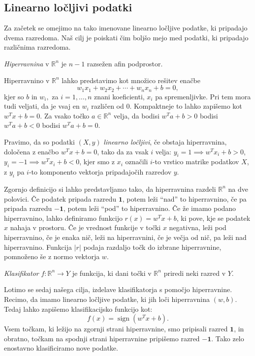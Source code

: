 \documentclass[mat1]{fmfdelo}
\newcommand{\R}{\mathbb R}
\DeclareMathOperator{\sign}{sign}
\newcommand{\pr}{\mathbf 1}
\newcommand{\nr}{\mathbf {-1}}
\begin{document}
\subsection{Linearno ločljivi podatki}

Za začetek se omejimo na tako imenovane linearno ločljive podatke, ki pripadajo dvema razredoma. Naš cilj je poiskati čim boljšo mejo med podatki, ki pripadajo različnima razredoma. 

\begin{definicija}
	\emph{Hiperravnina} v $\R^n$ je $n - 1$ razsežen afin podprostor. 
\end{definicija}
Hiperravnino v  $\R^n$ lahko predstavimo kot množico rešitev enačbe $$ w_1x_1 + w_2x_2 + \cdots + w_nx_n + b = 0,$$ kjer so $b$ in $w_i, $ za $ i = 1,\ldots,n $ znani koeficienti, $x_i$ pa spremenljivke. Pri tem mora tudi veljati, da je vsaj en $w_i$ različen od $0$. Kompaktneje to lahko zapišemo kot $w^Tx  + b = 0$. Za vsako točko $a \in \R^n$ velja, da bodisi $w^Ta  + b > 0$ bodisi $w^Ta+ b < 0$ bodisi $w^Ta+ b = 0$. 

\begin{definicija}
	Pravimo, da so podatki $(X, y)$ \emph{linearno ločljivi}, če obstaja hiperravnina, določena z enačbo $w^Tx+ b = 0$, tako da za vsak $i$ velja:
	$y_i = 1 \implies w^Tx_i+ b > 0$,  $y_i = -1 \implies w^Tx_i+ b < 0$, kjer smo z $x_i$ označili $i$-to vrstico matrike podatkov $X$, z $y_i$ pa $i$-to komponento vektorja pripadajočih razredov $y$.
\end{definicija} 

Zgornjo definicijo si lahko predstavljamo tako, da hiperravnina razdeli $\R^n$ na dve polovici. Če podatek pripada razredu $\pr$, potem leži ``nad'' to hiperravnino, če pa pripada razredu $\nr$, potem leži ``pod'' to hiperravnino.  Če že imamo podano hiperravnino, lahko definiramo funkcijo $r(x) = w^Tx+ b$, ki pove, kje se podatek $x$ nahaja v prostoru. Če je vrednost funkcije v točki $x$ negativna, leži pod hiperravnino, če je enaka nič, leži na hiperravnini, če je večja od nič, pa leži nad hiperravnino. Funkcija $|r|$ podaja razdaljo točk do izbrane hiperravnine, pomnoženo še z normo vektorja $w.$ 

\begin{definicija}
	\emph{Klasifikator} $f: \R^n \to Y$ je funkcija, ki dani točki v $\R^n$ priredi neki razred v $Y$.
\end{definicija}

Lotimo se sedaj našega cilja, izdelave klasifikatorja s pomočjo hiperravnine. Recimo, da imamo linearno ločljive podatke, ki jih loči hiperravnina $(w, b)$. Tedaj lahko zapišemo klasifikacijsko funkcijo kot: 
$$ f(x) = \sign{(w^Tx+ b)}.$$
Vsem točkam, ki ležijo na zgornji strani hiperravnine, smo pripisali razred $\pr$, in obratno, točkam na spodnji strani hiperravnine pripišemo razred $\nr$. Tako zelo enostavno klasificiramo nove podatke. 
\end{document}
